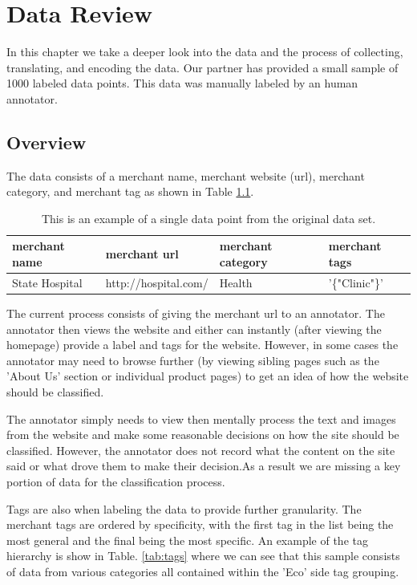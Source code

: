 \chapter{Data Review}

In this chapter we take a deeper look into the data and the process of collecting, translating, and encoding the data. Our partner has provided a small sample of 1000 labeled data points. This data was manually labeled by an human annotator. 

\section{Overview}

The data consists of a merchant name, merchant website (url), merchant category, and merchant tag as shown in Table \ref{tab:data_point}. 

\begin{table}[h]
\begin{tabular}{|l|l|l|l|}
\hline
merchant name            & merchant url            & merchant category & merchant tags           \\ \hline
State Hospital & http://hospital.com/ & Health   & '\{"Clinic"\}' \\ \hline
\end{tabular}
\caption{This is an example of a single data point from the original data set.}
\label{tab:data_point}
\end{table}


The current process consists of giving the merchant url to an annotator. The annotator then views the website and either can instantly (after viewing the homepage) provide a label and tags for the website. However, in some cases the annotator may need to browse further (by viewing sibling pages such as the 'About Us' section or individual product pages) to get an idea of how the website should be classified. 

The annotator simply needs to view then mentally process the text and images from the website and make some reasonable decisions on how the site should be classified. However, the annotator does not record what the content on the site said or what drove them to make their decision.As a result we are missing a key portion of data for the classification process. 

Tags are also when labeling the data to provide further granularity. The merchant tags are ordered by specificity, with the first tag in the list being the most general and the final being the most specific. An example of the tag hierarchy is show in Table. \ref{tab:tags} where we can see that this sample consists of data from various categories all contained within the 'Eco' side tag grouping.


